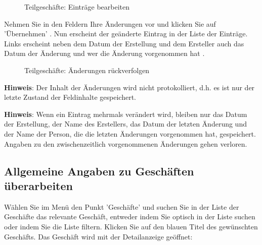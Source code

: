 \begin{figure}[H]
\caption{Teilgeschäfte: Einträge bearbeiten}
\end{figure}

Nehmen Sie in den Feldern Ihre Änderungen vor und klicken Sie auf 'Übernehmen' . Nun erscheint der geänderte Eintrag in der Liste der Einträge. Links erscheint neben dem Datum der Erstellung und dem Ersteller auch das Datum der Änderung und wer die Änderung vorgenommen hat .

\begin{figure}[H]
\caption{Teilgeschäfte: Änderungen rückverfolgen}
\end{figure}

\textbf{Hinweis}: Der Inhalt der Änderungen wird nicht protokolliert, d.h. es ist nur der letzte Zustand der Feldinhalte gespeichert.

\vspace{\baselineskip}

\textbf{Hinweis}: Wenn ein Eintrag mehrmals verändert wird, bleiben nur das Datum der Erstellung, der Name des Erstellers, das Datum der letzten Änderung und der Name der Person, die die letzten Änderungen vorgenommen hat, gespeichert. Angaben zu den zwischenzeitlich vorgenommenen Änderungen gehen verloren.

\subsection{Allgemeine Angaben zu Geschäften überarbeiten}

Wählen Sie im Menü den Punkt 'Geschäfte' und suchen Sie in der Liste der Geschäfte das relevante Geschäft, entweder indem Sie optisch in der Liste suchen oder indem Sie die Liste filtern. Klicken Sie auf den blauen Titel des gewünschten Geschäfts. Das Geschäft wird mit der Detailanzeige geöffnet:

